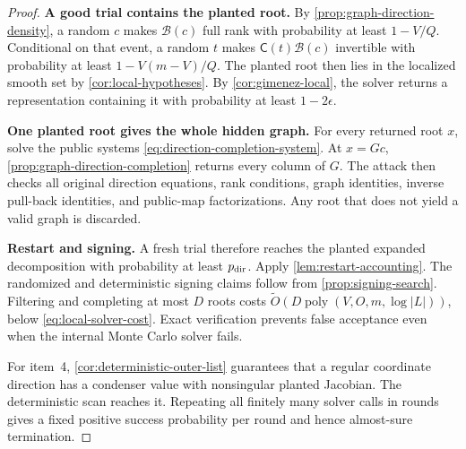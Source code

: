 \documentclass[11pt,a4paper]{article}
\theoremstyle{definition}
\theoremstyle{remark}
\newcommand{\proofstep}[1]{\par\smallskip\noindent\textbf{#1}\enspace}
\begin{document}
\begin{proof}
\proofstep{A good trial contains the planted root.}
By \cref{prop:graph-direction-density}, a random $c$ makes $\mathcal B(c)$ full rank with probability at least $1-V/Q$.  Conditional on that event, a random $t$ makes $\mathsf C(t)\mathcal B(c)$ invertible with probability at least $1-V(m-V)/Q$.  The planted root then lies in the localized smooth set by \cref{cor:local-hypotheses}.  By \cref{cor:gimenez-local}, the solver returns a representation containing it with probability at least $1-2\epsilon$.

\proofstep{One planted root gives the whole hidden graph.}
For every returned root $x$, solve the public systems \eqref{eq:direction-completion-system}.  At $x=Gc$, \cref{prop:graph-direction-completion} returns every column of $G$.  The attack then checks all original direction equations, rank conditions, graph identities, inverse pull-back identities, and public-map factorizations.  Any root that does not yield a valid graph is discarded.

\proofstep{Restart and signing.}
A fresh trial therefore reaches the planted expanded decomposition with probability at least $p_{\rm dir}$.  Apply \cref{lem:restart-accounting}.  The randomized and deterministic signing claims follow from \cref{prop:signing-search}.  Filtering and completing at most $D$ roots costs $\widetilde O(D\operatorname{poly}(V,O,m,\log|L|))$, below \eqref{eq:local-solver-cost}.  Exact verification prevents false acceptance even when the internal Monte Carlo solver fails.

For item~4, \cref{cor:deterministic-outer-list} guarantees that a regular coordinate direction has a condenser value with nonsingular planted Jacobian.  The deterministic scan reaches it.  Repeating all finitely many solver calls in rounds gives a fixed positive success probability per round and hence almost-sure termination.
\end{proof}
\end{document}
